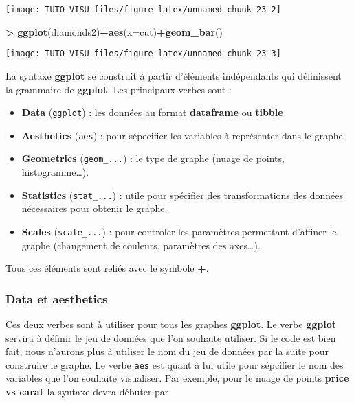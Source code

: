 \documentclass[]{article}
\newenvironment{Shaded}{\begin{snugshade}}{\end{snugshade}}
\newcommand{\DataTypeTok}[1]{\textcolor[rgb]{0.13,0.29,0.53}{#1}}
\newcommand{\KeywordTok}[1]{\textcolor[rgb]{0.13,0.29,0.53}{\textbf{#1}}}
\newcommand{\NormalTok}[1]{#1}
\newcommand{\OperatorTok}[1]{\textcolor[rgb]{0.81,0.36,0.00}{\textbf{#1}}}
\newcommand{\StringTok}[1]{\textcolor[rgb]{0.31,0.60,0.02}{#1}}
\providecommand{\tightlist}{%
  \setlength{\itemsep}{0pt}\setlength{\parskip}{0pt}}
\theoremstyle{definition}
\theoremstyle{definition}
\theoremstyle{definition}
\theoremstyle{remark}
\begin{document}
\begin{center}\texttt{[image: TUTO\_VISU\_files/figure-latex/unnamed-chunk-23-2]} \end{center}

\begin{Shaded}
\begin{Highlighting}[]
\OperatorTok{>}\StringTok{ }\KeywordTok{ggplot}\NormalTok{(diamonds2)}\OperatorTok{+}\KeywordTok{aes}\NormalTok{(}\DataTypeTok{x=}\NormalTok{cut)}\OperatorTok{+}\KeywordTok{geom_bar}\NormalTok{()}
\end{Highlighting}
\end{Shaded}

\begin{center}\texttt{[image: TUTO\_VISU\_files/figure-latex/unnamed-chunk-23-3]} \end{center}

La syntaxe \textbf{ggplot} se construit à partir d'éléments indépendants qui définissent la grammaire de \textbf{ggplot}. Les principaux verbes sont :

\begin{itemize}
\tightlist
\item
  \textbf{Data} (\texttt{ggplot}) : les données au format \textbf{dataframe} ou \textbf{tibble}
\item
  \textbf{Aesthetics} (\texttt{aes}) : pour sépecifier les variables à représenter dans le graphe.
\item
  \textbf{Geometrics} (\texttt{geom\_...}) : le type de graphe (nuage de points, histogramme\ldots{}).
\item
  \textbf{Statistics} (\texttt{stat\_...}) : utile pour spécifier des transformations des données nécessaires pour obtenir le graphe.
\item
  \textbf{Scales} (\texttt{scale\_...}) : pour controler les paramètres permettant d'affiner le graphe (changement de couleurs, paramètres des axes\ldots{}).
\end{itemize}

Tous ces éléments sont reliés avec le symbole \textbf{+}.

\hypertarget{data-et-aesthetics}{%
\subsubsection{Data et aesthetics}\label{data-et-aesthetics}}

Ces deux verbes sont à utiliser pour tous les graphes \textbf{ggplot}. Le verbe \textbf{ggplot} servira à définir le jeu de données que l'on souhaite utiliser. Si le code est bien fait, nous n'aurons plus à utiliser le nom du jeu de données par la suite pour construire le graphe. Le verbe \texttt{aes} est quant à lui utile pour sépcifier le nom des variables que l'on souhaite visualiser. Par exemple, pour le nuage de points \textbf{price vs carat} la syntaxe devra débuter par
\end{document}
